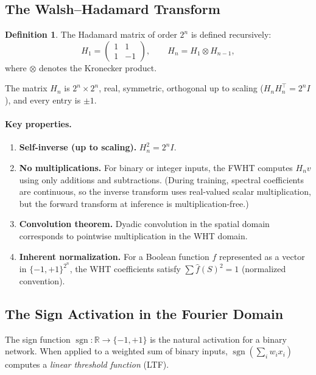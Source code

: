 \documentclass[12pt,a4paper]{article}
\theoremstyle{plain}
\theoremstyle{definition}
\newtheorem{definition}[theorem]{Definition}
\theoremstyle{remark}
\newcommand{\R}{\mathbb{R}}
\newcommand{\pmone}{\{-1,+1\}}
\newcommand{\fhat}{\widehat{f}}
\newcommand{\sgn}{\operatorname{sgn}}
\begin{document}
\subsection{The Walsh--Hadamard Transform}\label{sec:wht}

\begin{definition}\label{def:hadamard}
The Hadamard matrix of order $2^n$ is defined recursively:
\begin{equation}\label{eq:hadamard}
    H_1 = \begin{pmatrix} 1 & 1 \\ 1 & -1 \end{pmatrix}, \qquad H_n = H_1 \otimes H_{n-1},
\end{equation}
where $\otimes$ denotes the Kronecker product.
\end{definition}

The matrix $H_n$ is $2^n \times 2^n$, real, symmetric, orthogonal up to scaling ($H_n H_n^\top = 2^n I$), and every entry is $\pm 1$.

\paragraph{Key properties.}
\begin{enumerate}[label=(\roman*)]
    \item \textbf{Self-inverse (up to scaling).} $H_n^2 = 2^n I$.
    \item \textbf{No multiplications.} For binary or integer inputs, the FWHT computes $H_n v$ using only additions and subtractions. (During training, spectral coefficients are continuous, so the inverse transform uses real-valued scalar multiplication, but the forward transform at inference is multiplication-free.)
    \item \textbf{Convolution theorem.} Dyadic convolution in the spatial domain corresponds to pointwise multiplication in the WHT domain.
    \item \textbf{Inherent normalization.} For a Boolean function $f$ represented as a vector in $\pmone^{2^n}$, the WHT coefficients satisfy $\sum \fhat(S)^2 = 1$ (normalized convention).
\end{enumerate}


\subsection{The Sign Activation in the Fourier Domain}\label{sec:sign-fourier}

The sign function $\sgn \colon \R \to \pmone$ is the natural activation for a binary network. When applied to a weighted sum of binary inputs, $\sgn(\sum_i w_i x_i)$ computes a \emph{linear threshold function} (LTF).
\end{document}
